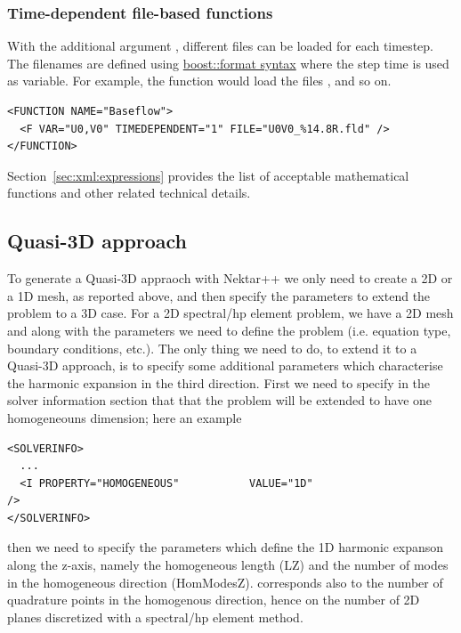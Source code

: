 \subsubsection{Time-dependent file-based functions}

With the additional argument , different files can be
loaded for each timestep. The filenames are defined using
\href{http://www.boost.org/doc/libs/1_56_0/libs/format/doc/format.html#syntax}{boost::format
  syntax} where the step time is used as variable. For example, the function
 would load the files ,
 and so on.

\begin{lstlisting}[style=XMLStyle]
<FUNCTION NAME="Baseflow">
  <F VAR="U0,V0" TIMEDEPENDENT="1" FILE="U0V0_%14.8R.fld" />
</FUNCTION>
\end{lstlisting}

Section~\ref{sec:xml:expressions} provides the list of acceptable
mathematical functions and other related technical details.

\subsection{Quasi-3D approach}

To generate a Quasi-3D appraoch with Nektar++ we only need to create a 2D or a
1D mesh, as reported above, and then specify the parameters to extend the
problem to a 3D case. For a 2D spectral/hp element problem, we have a 2D mesh
and along with the parameters we need to define the problem (i.e. equation type,
boundary conditions, etc.). The only thing we need to do, to extend it to a
Quasi-3D approach, is to specify some additional parameters which characterise
the harmonic expansion in the third direction. First we need to specify in the
solver information section that that the problem will be extended to have one
homogeneouns dimension; here an example

\begin{lstlisting}[style=XMLStyle]
<SOLVERINFO>
  ...
  <I PROPERTY="HOMOGENEOUS"           VALUE="1D"                       />
</SOLVERINFO>
\end{lstlisting}

then we need to specify the parameters which define the 1D harmonic expanson
along the z-axis, namely the homogeneous length (LZ) and the number of modes in
the homogeneous direction (HomModesZ).  corresponds also to the number
of quadrature points in the homogenous direction, hence on the number of 2D
planes discretized with a spectral/hp element method.

